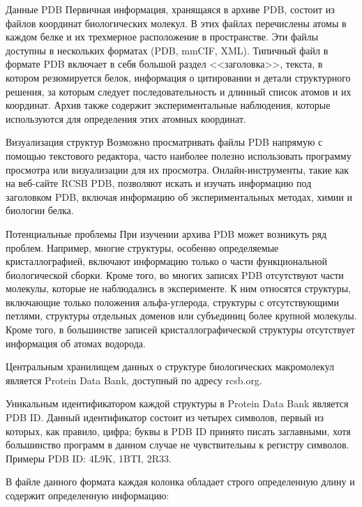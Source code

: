 Данные PDB
Первичная информация, хранящаяся в архиве PDB, состоит из файлов координат биологических молекул. В этих файлах перечислены атомы в каждом белке и их трехмерное расположение в пространстве. Эти файлы доступны в нескольких форматах (PDB, mmCIF, XML). Типичный файл в формате PDB включает в себя большой раздел <<заголовка>>, текста, в котором резюмируется белок, информация о цитировании и детали структурного решения, за которым следует последовательность и длинный список атомов и их координат. Архив также содержит экспериментальные наблюдения, которые используются для определения этих атомных координат.

Визуализация структур
Возможно просматривать файлы PDB напрямую с помощью текстового редактора, часто наиболее полезно использовать программу просмотра или визуализации для их просмотра. Онлайн-инструменты, такие как на веб-сайте RCSB PDB, позволяют искать и изучать информацию под заголовком PDB, включая информацию об экспериментальных методах, химии и биологии белка.

Потенциальные проблемы
При изучении архива PDB может возникуть ряд проблем. Например, многие структуры, особенно определяемые кристаллографией, включают информацию только о части функциональной биологической сборки. Кроме того, во многих записях PDB отсутствуют части молекулы, которые не наблюдались в эксперименте. К ним относятся структуры, включающие только положения альфа-углерода, структуры с отсутствующими петлями, структуры отдельных доменов или субъединиц более крупной молекулы. Кроме того, в большинстве записей кристаллографической структуры отсутствует информация об атомах водорода.

Центральным хранилищем данных о структуре биологических макромолекул является Protein Data Bank, доступный по адресу rcsb.org.

Уникальным идентификатором каждой структуры в Protein Data Bank является PDB ID. Данный идентификатор состоит из четырех символов, первый из которых, как правило, цифра; буквы в PDB ID принято писать заглавными, хотя большинство программ в данном случае не чувствительны к регистру символов. Примеры PDB ID: 4L9K, 1BTI, 2R33.

В файле данного формата каждая колонка обладает строго определенную длину и содержит определенную информацию:

